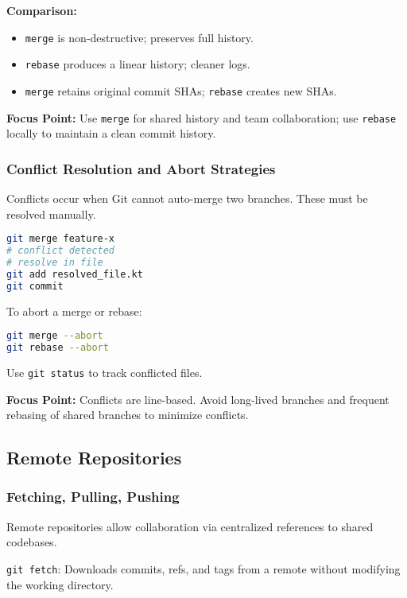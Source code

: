 \documentclass[a4paper,12pt]{article}
\begin{document}
\textbf{Comparison:}
\begin{itemize}
  \item \texttt{merge} is non-destructive; preserves full history.
  \item \texttt{rebase} produces a linear history; cleaner logs.
  \item \texttt{merge} retains original commit SHAs; \texttt{rebase} creates new SHAs.
\end{itemize}

\textbf{Focus Point:} Use \texttt{merge} for shared history and team collaboration; use \texttt{rebase} locally to maintain a clean commit history.

\subsubsection{Conflict Resolution and Abort Strategies}

Conflicts occur when Git cannot auto-merge two branches. These must be resolved manually.

\begin{lstlisting}[language=bash]
git merge feature-x
# conflict detected
# resolve in file
git add resolved_file.kt
git commit
\end{lstlisting}

To abort a merge or rebase:

\begin{lstlisting}[language=bash]
git merge --abort
git rebase --abort
\end{lstlisting}

Use \texttt{git status} to track conflicted files.

\textbf{Focus Point:} Conflicts are line-based. Avoid long-lived branches and frequent rebasing of shared branches to minimize conflicts.

\subsection{Remote Repositories}

\subsubsection{Fetching, Pulling, Pushing}

Remote repositories allow collaboration via centralized references to shared codebases.

\texttt{git fetch}: Downloads commits, refs, and tags from a remote without modifying the working directory.
\end{document}
